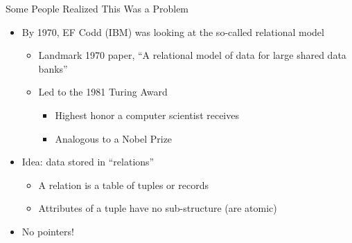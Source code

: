 \documentclass[aspectratio=169]{beamer}
\begin{document}
\begin{frame}{Some People Realized This Was a Problem}

\begin{itemize}
\item By 1970, EF Codd (IBM) was looking at the so-called relational model
	\begin{itemize}
	\item Landmark 1970 paper, ``A relational model of data for large shared data banks''
	\item Led to the 1981 Turing Award
		\begin{itemize}
		\item Highest honor a computer scientist receives
		\item Analogous to a Nobel Prize
		\end{itemize}
	\end{itemize}
\item Idea: data stored in ``relations'' 
	\begin{itemize}
	\item A relation is a table of tuples or records
	\item Attributes of a tuple have no sub-structure (are atomic)
	\end{itemize}
\item No pointers!
\end{itemize}
\end{frame}
\end{document}
